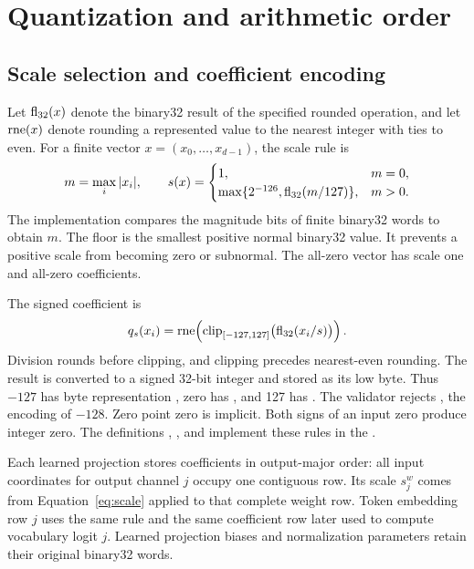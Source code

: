 \section{Quantization and arithmetic order}
\label{sec:arithmetic}

\subsection{Scale selection and coefficient encoding}

Let $\operatorname{fl}_{32}(x)$ denote the binary32 result of the specified rounded operation, and let $\operatorname{rne}(x)$ denote rounding a represented value to the nearest integer with ties to even.  For a finite vector $x=(x_0,\ldots,x_{d-1})$, the scale rule is
\begin{equation}
 m=\max_i |x_i|,\qquad
 s(x)=
 \begin{cases}
  1,&m=0,\\
  \max\{2^{-126},\operatorname{fl}_{32}(m/127)\},&m>0.
 \end{cases}
 \label{eq:scale}
\end{equation}
The implementation compares the magnitude bits of finite binary32 words to obtain $m$.  The floor is the smallest positive normal binary32 value.  It prevents a positive scale from becoming zero or subnormal.  The all-zero vector has scale one and all-zero coefficients.

The signed coefficient is
\begin{equation}
 q_s(x_i)=\operatorname{rne}\!\left(\operatorname{clip}_{[-127,127]}\bigl(\operatorname{fl}_{32}(x_i/s)\bigr)\right).
 \label{eq:quant}
\end{equation}
Division rounds before clipping, and clipping precedes nearest-even rounding.  The result is converted to a signed 32-bit integer and stored as its low byte.  Thus $-127$ has byte representation , zero has , and 127 has .  The validator rejects , the encoding of $-128$.  Zero point zero is implicit.  Both signs of an input zero produce integer zero.  The definitions , , and  implement these rules in the .

Each learned projection stores coefficients in output-major order: all input coordinates for output channel $j$ occupy one contiguous row.  Its scale $s^w_j$ comes from Equation~\eqref{eq:scale} applied to that complete weight row.  Token embedding row $j$ uses the same rule and the same coefficient row later used to compute vocabulary logit $j$.  Learned projection biases and normalization parameters retain their original binary32 words.

